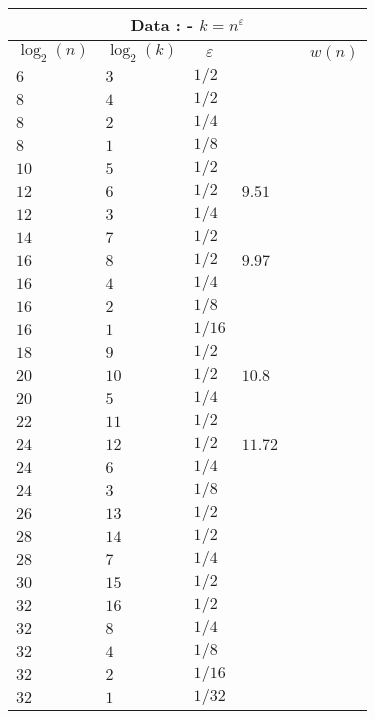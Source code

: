 
\begin{center}
\begin{tabular}{|l|l|l|l|l|l|}
        	\hline
        	\multicolumn{6}{|c|}{\ccb \textbf{Data : \Rm - $k = n^{\varepsilon}$}}\\
        	\hline
        	\hline
        	\multicolumn{1}{|c|}{\cca \textbf{$\log_2(n)$}}&
        	\multicolumn{1}{c|}{\cca \textbf{$\log_2(k)$}}&
        	\multicolumn{1}{c|}{\cca \textbf{$\varepsilon$}}&
        	\multicolumn{1}{c|}{\cca \textbf{\fgm}}&
        	\multicolumn{1}{c|}{\cca \textbf{\fgr}}&
        	\multicolumn{1}{c|}{\cca \textbf{$w(n)$}}\\
        	\hline
        	$6$&$3$&$1/2$& & &\\
			\hline
			$8$&$4$&$1/2$& & & \\
			\hdashline
			$8$&$2$&$1/4$& & & \\
			\hdashline
			$8$&$1$&$1/8$& & & \\
			\hline
			$10$&$5$&$1/2$& & & \\
			\hline
			$12$&$6$&$1/2$&$9.51$ & & \\
			\hdashline
			$12$&$3$&$1/4$& & & \\
			\hline
			$14$&$7$&$1/2$& & & \\
			\hline
			$16$&$8$&$1/2$&$9.97$ & & \\
			\hdashline
			$16$&$4$&$1/4$& & & \\
			\hdashline
			$16$&$2$&$1/8$& & & \\
			\hdashline
			$16$&$1$&$1/16$& & & \\
			\hline
			$18$&$9$&$1/2$& & & \\
			\hline
			$20$&$10$&$1/2$&$10.8$ & & \\
			\hdashline
			$20$&$5$&$1/4$& & & \\
			\hline
			$22$&$11$&$1/2$& & & \\
			\hline
			$24$&$12$&$1/2$&$11.72$ & & \\
			\hline
			$24$&$6$&$1/4$& & & \\
			\hline
			$24$&$3$&$1/8$& & & \\
			\hline
			$26$&$13$&$1/2$& & & \\
			\hline
			$28$&$14$&$1/2$& & & \\
			\hline
			$28$&$7$&$1/4$& & & \\
			\hline
			$30$&$15$&$1/2$& & & \\
			\hline
			$32$&$16$&$1/2$& & & \\
			\hline
			$32$&$8$&$1/4$& & & \\
			\hline
			$32$&$4$&$1/8$& & & \\
			\hline
			$32$&$2$&$1/16$& & & \\
			\hline
			$32$&$1$&$1/32$& & & \\
			\hline
        \end{tabular}\label{Tab: RMin - k=1/2}
\end{center}
